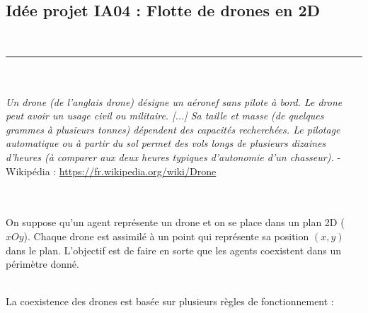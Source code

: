 \documentclass[11pt]{report}
\begin{document}
~\\
\begin{center}
\section*{Idée projet IA04 : Flotte de drones en 2D}

~\\
\rule{\textwidth}{1pt}
\end{center}

~\\\\
\textit{Un drone (de l'anglais drone) désigne un aéronef sans pilote à bord. Le drone peut avoir un usage civil ou militaire. [...] Sa taille et masse (de quelques grammes à plusieurs tonnes) dépendent des capacités recherchées. Le pilotage automatique ou à partir du sol permet des vols longs de plusieurs dizaines d'heures (à comparer aux deux heures typiques d'autonomie d'un chasseur).} - Wikipédia :  \textcolor{blue}{\url{https://fr.wikipedia.org/wiki/Drone}}

~\\\\
On suppose qu'un agent représente un drone et on se place dans un plan 2D ($xOy$). Chaque drone est assimilé à un point qui représente sa position $(x, y)$ dans le plan. L'objectif est de faire en sorte que les agents coexistent dans un périmètre donné.

~\\
La coexistence des drones est basée sur plusieurs règles de fonctionnement : 
\end{document}
